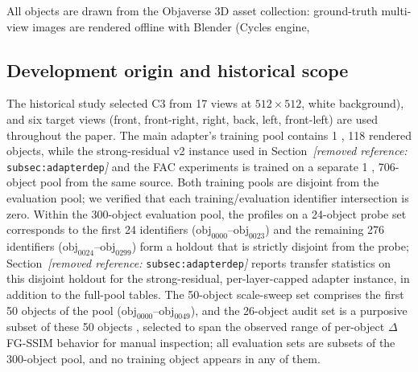\documentclass[times,twocolumn,final]{elsarticle}
\providecommand{\DIFadd}[1]{{\protect\color{blue} \sf #1}} %
\providecommand{\DIFdel}[1]{{\protect\color{red} \scriptsize #1}} %
\providecommand{\DIFaddbegin}{} %
\providecommand{\DIFaddend}{} %
\providecommand{\DIFdelbegin}{} %
\providecommand{\DIFdelend}{} %
\begin{document}
\DIFdelbegin %

\DIFdel{All objects are drawn from the Objaverse 3D asset collection: ground-truth multi-view images are rendered offline with Blender (Cycles engine, }\DIFdelend \DIFaddbegin \subsection{Development origin and historical scope}
\label{subsec:c3}
\DIFadd{The historical study selected C3 from }\DIFaddend 17 \DIFdelbegin \DIFdel{views at $512\times512$, white background), and six target views (front, front-right, right, back, left, front-left) are used throughout the paper. The main adapter's training pool contains 1}%
\DIFdel{,}%
\DIFdel{118 rendered objects, while the strong-residual v2 instance used in Section~\textit{[removed reference: }\texttt{subsec:adapterdep}\textit{]} and the FAC experiments is trained on a separate 1}%
\DIFdel{,}%
\DIFdel{706-object pool from the same source.
Both training pools are disjoint from the evaluation pool; we verified that each training/evaluation identifier intersection is zero. Within the 300-object evaluation pool, the }\DIFdelend \DIFaddbegin \DIFadd{profiles on a }\DIFaddend 24-object \DIFdelbegin \DIFdel{probe set corresponds to the first 24 identifiers ($\mathrm{obj}_{0000}$--$\mathrm{obj}_{0023}$) and the remaining 276 identifiers ($\mathrm{obj}_{0024}$--$\mathrm{obj}_{0299}$) form a holdout that is strictly disjoint from the probe; Section~\textit{[removed reference: }\texttt{subsec:adapterdep}\textit{]} reports transfer statistics on this disjoint holdout for the strong-residual, per-layer-capped adapter instance, in addition to the full-pool tables. The 50-object scale-sweep set comprises the first 50 objects of the pool ($\mathrm{obj}_{0000}$--$\mathrm{obj}_{0049}$), and the 26-object audit set is a purposive subset of these 50 objects , selected to span the observed range of per-object $\Delta$FG-SSIM behavior for manual inspection; all evaluation sets are subsets of the 300-object pool, and no training object appears in any of them. }%
\end{document}
